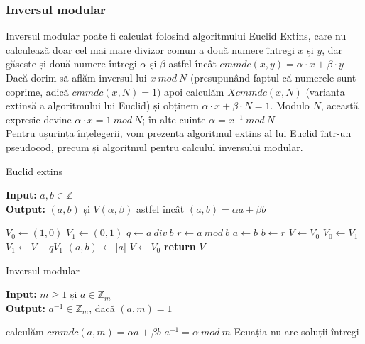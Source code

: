 \documentclass[12]{report}
\begin{document}
       \subsubsection{Inversul modular}
         Inversul modular poate fi calculat folosind algoritmului Euclid Extins, care nu calculează doar cel mai mare divizor comun a două numere întregi $x$ și $y$, dar găsește și două numere întregi $ \alpha $ și $  \beta $ astfel încât $ cmmdc(x,y) = \alpha \cdot   x + \beta \cdot   y$ \\
        Dacă dorim să aflăm inversul lui  $x \ mod \ N$ (presupunând faptul că numerele sunt coprime, adică $cmmdc(x,N)=1)$ apoi calculăm $Xcmmdc(x,N)$ (varianta extinsă a algoritmului lui Euclid) și obținem $ \alpha \cdot   x + \beta \cdot   N = 1$. Modulo $N$, această expresie devine $\alpha \cdot   x  = 1 \ mod \ N$; în alte cuinte $\alpha= x^{-1} \ mod \ N$ \\
        Pentru ușurința înțelegerii, vom prezenta algoritmul extins al lui Euclid într-un pseudocod, precum și algoritmul pentru calculul inversului modular.  
        \begin{algorithm}[H]
		   \caption{Euclid extins}
		   \textbf{Input:} $a,b \in \mathbb{Z}$ \\
		   \textbf{Output:} $(a,b)$ și $V(\alpha, \beta)$ astfel încât $(a,b) = \alpha a + \beta b$
		   \begin{algorithmic}
		   \State $V_0 \gets (1,0)$
		   \State $V_1 \gets (0,1)$
		    \State $q \gets a  \ div \ b$
		    \State $r \gets a \ mod  \ b$
		    \State $a \gets b$
		    \State $b \gets r$
		    \State $V \gets V_0$
		    \State $V_0 \gets V_1$
		    \State $V_1 \gets V - qV_1$
		   \EndWhile
		   \State $(a,b) \ \gets \left| a \right|$
		   \State $V \gets V_0$
		   \State \textbf{return} $V$
		   \end{algorithmic}
		   \end{algorithm}
		   
		   
		   \begin{algorithm}[H]
		   \caption{Inversul modular}
		   \textbf{Input:} $ m \geq 1$ și $ a \in \mathbb{Z}_m$ \\
		   \textbf{Output:} $ a^{-1} \in \mathbb{Z}_m$, dacă $(a,m)=1$
		   \begin{algorithmic}
		   \State calculăm $cmmdc(a,m)= \alpha a + \beta b$
		   \If{ $ cmmdc(a,m)=1 $ }
		   \State $ a^{-1} = \alpha \ mod \ m$
		   \Else
    		\State Ecuația nu are soluții întregi 
		   \EndIf
		   \end{algorithmic}
		   \end{algorithm}
        
\end{document}
